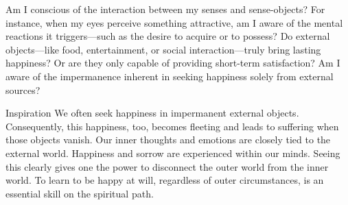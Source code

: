 
\newpage
\begin{mananam}{} 
\mananamtext Am I conscious of the interaction between my senses and sense-objects? For instance, when my eyes perceive something attractive, am I aware of the mental reactions it triggers—such as the desire to acquire or to possess?
Do external objects—like food, entertainment, or social interaction—truly bring lasting happiness? Or are they only capable of providing short-term satisfaction? Am I aware of the impermanence inherent in seeking happiness solely from external sources?
\end{mananam}
\WritingHand{}
\begin{inspiration}{\mananamfont Inspiration}
\mananamtext We often seek happiness in impermanent external objects. Consequently, this happiness, too, becomes fleeting and leads to suffering when those objects vanish. Our inner thoughts and emotions are closely tied to the external world. Happiness and sorrow are experienced within our minds. 
Seeing this clearly gives one the power to disconnect the outer world from the inner world. To learn to be happy at will, regardless of outer circumstances, is an essential skill on the spiritual path.
\end{inspiration}
\newpage



